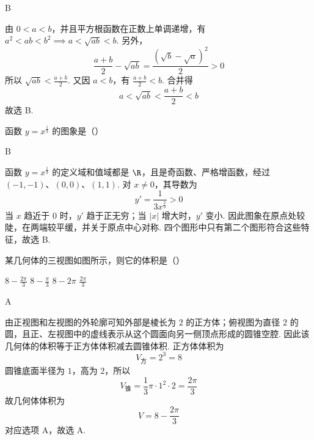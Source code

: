 \begin{answer}
B
\end{answer}

\begin{solution}
由 \(0<a<b\)，并且平方根函数在正数上单调递增，有
\(a^2<ab<b^2\implies a<\sqrt{ab}<b\).
另外，
\[
\frac{a+b}{2}-\sqrt{ab}=\frac{(\sqrt b-\sqrt a)^2}{2}>0
\]
所以 \(\sqrt{ab}<\frac{a+b}{2}\). 又因 \(a<b\)，有 \(\frac{a+b}{2}<b\). 合并得
\[
a<\sqrt{ab}<\frac{a+b}{2}<b
\]
故选 B.
\end{solution}

\begin{problem}
函数 \( y = x^{\frac{1}{3}} \) 的图象是（\quad）

    {}
    {}
    {}
\end{problem}

\begin{answer}
B
\end{answer}

\begin{solution}
函数 \(y=x^{\frac13}\) 的定义域和值域都是 \(\R\)，且是奇函数、严格增函数，经过 \((-1,-1)\)、\((0,0)\)、\((1,1)\). 对 \(x\ne0\)，其导数为
\[
y'=\frac{1}{3x^{\frac23}}>0
\]
当 \(x\) 趋近于 \(0\) 时，\(y'\) 趋于正无穷；当 \(|x|\) 增大时，\(y'\) 变小. 因此图象在原点处较陡，在两端较平缓，并关于原点中心对称. 四个图形中只有第二个图形符合这些特征，故选 B.
\end{solution}

\begin{problem}
某几何体的三视图如图所示，则它的体积是（\quad）


\choices
    {\(8 - \frac{2\pi}{3}\)}
    {\(8 - \frac{\pi}{3}\)}
    {\(8 - 2\pi\)}
    {\(\frac{2\pi}{3}\)}
\end{problem}

\begin{answer}
A
\end{answer}

\begin{solution}
由正视图和左视图的外轮廓可知外部是棱长为 \(2\) 的正方体；俯视图为直径 \(2\) 的圆，且正、左视图中的虚线表示从这个圆面向另一侧顶点形成的圆锥空腔. 因此该几何体的体积等于正方体体积减去圆锥体积. 正方体体积为
\[
V_{\text{方}}=2^3=8
\]
圆锥底面半径为 \(1\)，高为 \(2\)，所以
\[
V_{\text{锥}}=\frac13\pi\cdot1^2\cdot2=\frac{2\pi}{3}
\]
故几何体体积为
\[
V=8-\frac{2\pi}{3}
\]
对应选项 A，故选 A.
\end{solution}


